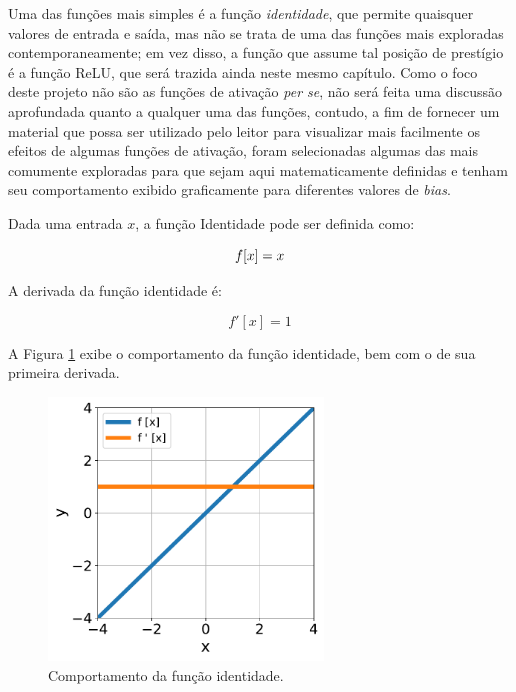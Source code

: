 Uma das funções mais simples é a função \textit{identidade}, que permite quaisquer valores de entrada e saída, mas não se trata de uma das funções mais exploradas contemporaneamente; em vez disso, a função que assume tal posição de prestígio é a função ReLU, que será trazida ainda neste mesmo capítulo. Como o foco deste projeto não são as funções de ativação \textit{per se}, não será feita uma discussão aprofundada quanto a qualquer uma das funções, contudo, a fim de fornecer um material que possa ser utilizado pelo leitor para visualizar mais facilmente os efeitos de algumas funções de ativação, foram selecionadas algumas das mais comumente exploradas para que sejam aqui matematicamente definidas e tenham seu comportamento exibido graficamente para diferentes valores de \textit{bias}.


\begin{definition}
    Dada uma entrada $x$, a função Identidade pode ser definida como:

    \begin{equation}
        f[x] = x
        \vspace{0.2cm}
        \label{eq:ann_identity_function}
    \end{equation}

    A derivada da função identidade é:

    \begin{equation}
        f'[x] = 1
        \label{eq:ann_identity_function_dy}
    \end{equation}
    
\end{definition}

A Figura \ref{fig:ann_identity_function} exibe o comportamento da função identidade, bem com o de sua primeira derivada.

\begin{figure}[H]
    \centering
    \includegraphics[width=0.65\textwidth]{figs/ann_identity_function.pdf}
    \caption{Comportamento da função identidade.}
    \label{fig:ann_identity_function}
\end{figure}


